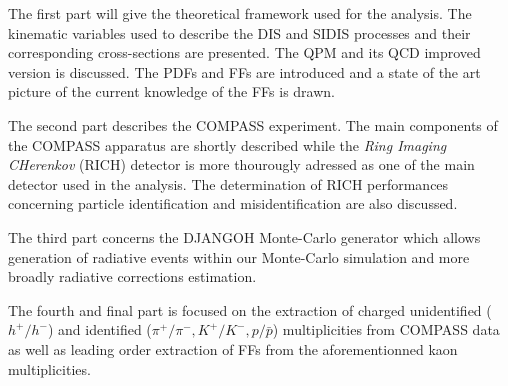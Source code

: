 The first part will give the theoretical framework used for the analysis. The kinematic variables used to describe the DIS and SIDIS processes and their corresponding cross-sections are presented. The QPM and its QCD improved version is discussed. The PDFs and FFs are introduced and a state of the art picture of the current knowledge of the FFs is drawn.

The second part describes the COMPASS experiment. The main components of the COMPASS apparatus are shortly described while the \textit{Ring Imaging CHerenkov} (RICH) detector is more thourougly adressed as one of the main detector used in the analysis. The determination of RICH performances concerning particle identification and misidentification are also discussed.

The third part concerns the DJANGOH Monte-Carlo generator which allows generation of radiative events within our Monte-Carlo simulation and more broadly radiative corrections estimation.

The fourth and final part is focused on the extraction of charged unidentified ($h^+/h^-$) and identified ($\pi^+/\pi^-,K^+/K^-,p/\bar{p}$) multiplicities from COMPASS data as well as leading order extraction of FFs from the aforementionned kaon multiplicities.
